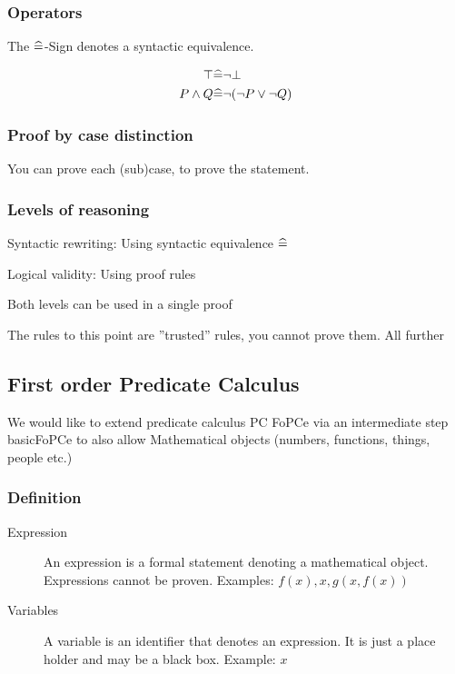 \subsubsection{Operators}

The $\widehat{=}$-Sign denotes a syntactic equivalence.

\begin{align*}
	\top & \equalhat \neg \bot \\
	P \land Q & \equalhat \neg(\neg P \lor \neg Q) %
\end{align*}


\subsubsection{Proof by case distinction}

You can prove each (sub)case, to prove the statement. %

\subsubsection{Levels of reasoning}
Syntactic rewriting: Using syntactic equivalence $\widehat{=}$

Logical validity: Using proof rules

Both levels can be used in a single proof

The rules to this point are ''trusted'' rules, you cannot prove them. All further 

\subsection{First order Predicate Calculus}

We would like to extend predicate calculus PC FoPCe via an intermediate step basicFoPCe to also allow Mathematical objects (numbers, functions, things, people etc.)

\subsubsection{Definition}

\begin{description}
	\item[Expression] An expression is a formal statement denoting a mathematical object. Expressions cannot be proven. Examples: $f(x), x, g(x, f(x))$
	\item[Variables] A variable is an identifier that denotes an expression. It is just a place holder and may be a black box. Example: $x$
\end{description}

